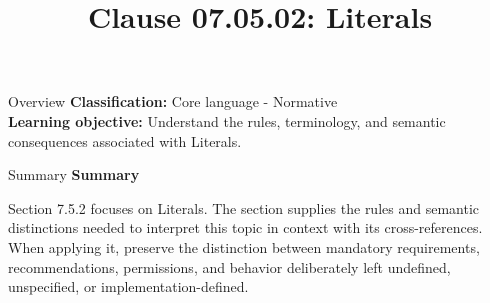 \documentclass[10pt,letterpaper]{article}
\title{Clause 07.05.02: Literals}
\author{}
\date{}
\begin{document}
\maketitle
\begin{CornellOverviewBox}{Overview}
\textbf{Classification:} Core language - Normative\\[2pt]
\textbf{Learning objective:} Understand the rules, terminology, and semantic consequences associated with Literals.
\end{CornellOverviewBox}\begin{CornellSummaryBox}{Summary}
{\sffamily\bfseries\color{Accent} Summary}\par\vspace{3pt}Section 7.5.2 focuses on Literals. The section supplies the rules and semantic distinctions needed to interpret this topic in context with its cross-references. When applying it, preserve the distinction between mandatory requirements, recommendations, permissions, and behavior deliberately left undefined, unspecified, or implementation-defined.
\end{CornellSummaryBox}
\end{document}
